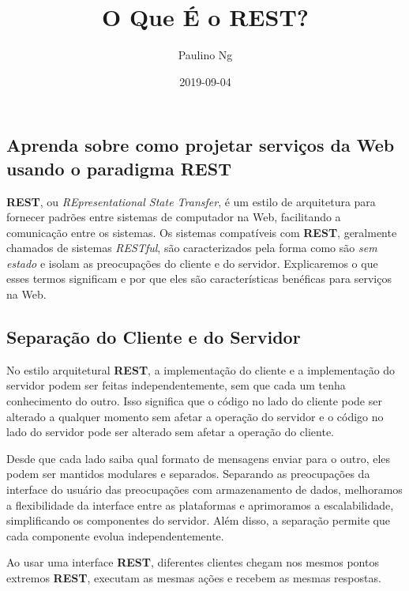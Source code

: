 \documentclass[12pt, a4paper
]{article}
\title{O Que É o REST?}
\author{Paulino Ng}
\date{2019-09-04}
\begin{document}
\maketitle

\hypertarget{aprenda-sobre-como-projetar-serviuxe7os-da-web-usando-o-paradigma-rest}{%
\subsection{Aprenda sobre como projetar serviços da Web usando o
paradigma
REST}\label{aprenda-sobre-como-projetar-serviuxe7os-da-web-usando-o-paradigma-rest}}

\textbf{REST}, ou \emph{REpresentational State Transfer}, é um estilo de
arquitetura para fornecer padrões entre sistemas de computador na Web,
facilitando a comunicação entre os sistemas. Os sistemas compatíveis com
\textbf{REST}, geralmente chamados de sistemas \emph{RESTful}, são
caracterizados pela forma como são \emph{sem estado} e isolam as
preocupações do cliente e do servidor. Explicaremos o que esses termos
significam e por que eles são características benéficas para serviços na
Web.

\hypertarget{separauxe7uxe3o-do-cliente-e-do-servidor}{%
\subsection{Separação do Cliente e do Servidor}\label{separauxe7uxe3o-do-cliente-e-do-servidor}}

No estilo arquitetural \textbf{REST}, a implementação do cliente e a
implementação do servidor podem ser feitas independentemente, sem que
cada um tenha conhecimento do outro. Isso significa que o código no lado
do cliente pode ser alterado a qualquer momento sem afetar a operação do
servidor e o código no lado do servidor pode ser alterado sem afetar a
operação do cliente.

Desde que cada lado saiba qual formato de mensagens enviar para o outro,
eles podem ser mantidos modulares e separados. Separando as preocupações
da interface do usuário das preocupações com armazenamento de dados,
melhoramos a flexibilidade da interface entre as plataformas e
aprimoramos a escalabilidade, simplificando os componentes do servidor.
Além disso, a separação permite que cada componente evolua
independentemente.

Ao usar uma interface \textbf{REST}, diferentes clientes chegam nos
mesmos pontos extremos \textbf{REST}, executam as mesmas ações e recebem
as mesmas respostas.
\end{document}
